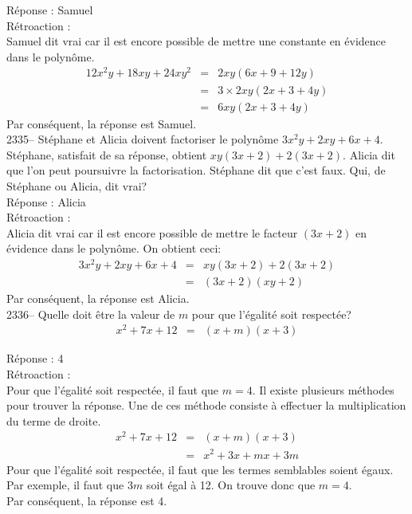 \documentclass[letterpaper, 12pt]{article}
\begin{document}
R\'eponse : Samuel\\

R\'etroaction :\\
Samuel dit vrai car il est encore possible de mettre une constante en \'evidence dans le polyn\^ome.
\begin{eqnarray*}
12x^{2}y+18xy+24xy^{2} &=& 2xy(6x+9+12y)\\
&=& 3\times 2xy(2x+3+4y)\\
&=& 6xy(2x+3+4y)
\end{eqnarray*}
Par cons\'equent, la r\'eponse est Samuel.\\

2335-- St\'ephane et Alicia doivent factoriser le polyn\^ome $3x^{2}y+2xy+6x+4$. St\'ephane, satisfait de sa r\'eponse, obtient $xy(3x+2)+2(3x+2)$. Alicia dit que l'on peut poursuivre la factorisation. St\'ephane dit que c'est faux. Qui, de St\'ephane ou Alicia, dit vrai? \\

R\'eponse : Alicia\\

R\'etroaction :\\
Alicia dit vrai car il est encore possible de mettre le facteur $(3x+2)$ en \'evidence dans le polyn\^ome. On obtient ceci:
\begin{eqnarray*}
3x^{2}y+2xy+6x+4 &=& xy(3x+2)+2(3x+2)\\
&=& (3x+2)(xy+2)
\end{eqnarray*}
Par cons\'equent, la r\'eponse est Alicia.\\

2336-- Quelle doit \^etre la valeur de $m$ pour que l'\'egalit\'e soit respect\'ee?\\
\begin{eqnarray*}
x^{2}+7x+12&=&(x+m)(x+3)
\end{eqnarray*}

R\'eponse : 4\\

R\'etroaction :\\
Pour que l'\'egalit\'e soit respect\'ee, il faut que $m=4$. Il existe plusieurs m\'ethodes pour trouver la r\'eponse. Une de ces m\'ethode consiste \`a effectuer la multiplication du terme de droite.
\begin{eqnarray*}
x^{2}+7x+12&=&(x+m)(x+3)\\
&=&x^{2}+3x+mx+3m
\end{eqnarray*}
Pour que l'\'egalit\'e soit respect\'ee, il faut que les termes semblables soient \'egaux. Par exemple, il faut que $3m$ soit \'egal \`a 12. On trouve donc que $m=4$.\\
Par cons\'equent, la r\'eponse est 4.\\
\end{document}
